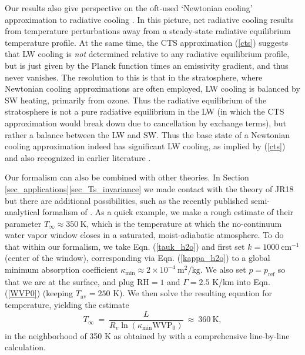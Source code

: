 \documentclass{ametsoc}
\newcommand{\beqn}{\begin{equation}}
\newcommand{\eeqn}{\end{equation}}
\newcommand{\n}{\nonumber}
\newcommand{\eqnref}[1]{(\ref{#1})}
\newcommand{\kg}{\ensuremath{\mathrm{kg}}}
\newcommand{\meter}{\ensuremath{\mathrm{m}}}
\newcommand{\Kelvin}{\ensuremath{\mathrm{K}}}
\newcommand{\cminverse}{\ensuremath{\mathrm{cm^{-1}}}}
\newcommand{\Rv}{\ensuremath{R_v}}
\newcommand{\Ts}{\ensuremath{T_\mathrm{s}}}
\newcommand{\RH}{\ensuremath{\mathrm{RH}}}
\newcommand{\pref}{\ensuremath{p_{\mathrm{ref}}}}
\newcommand{\WVP}{\ensuremath{\mathrm{WVP}}}
\newcommand{\Tav}{\ensuremath{T_{\mathrm{av}}}}
\newcommand{\Tinf}{\ensuremath{T_\infty}}
\newcommand{\kappamin}{\ensuremath{\kappa_{\mathrm{min}}}}
\begin{document}
Our results also give perspective on the oft-used `Newtonian cooling' approximation to radiative cooling \cite[e.g.][]{fueglistaler2009}. In this picture, net radiative cooling results from temperature perturbations away from a steady-state radiative equilibrium  temperature profile. At the same time, the CTS approximation \eqnref{cts}  suggests that LW cooling is \emph{not} determined relative to any radiative equilibrium profile, but is just given by the Planck function  times an emissivity gradient, and thus never vanishes. The resolution to this is that in the stratosphere, where Newtonian cooling approximations are often employed, LW cooling is balanced by SW heating, primarily from ozone. Thus the radiative equilibrium of the stratosphere is not a pure radiative equilibrium in the LW (in which the CTS approximation would break down due to cancellation by exchange terms), but rather a balance between the LW and SW. Thus the base state of a Newtonian cooling approximation indeed has significant LW cooling, as implied by \eqnref{cts} and also recognized in earlier literature \citep[e.g.][]{dickinson1973}.

Our formalism can also be combined with other theories. In Section \ref{sec_applications}\ref{sec_Ts_invariance} we made contact with the theory of JR18 but there are additional possibilities, such as the recently published semi-analytical formalism of \cite{koll2018}. As a quick example, we make a rough estimate of their parameter $\Tinf\approx 350 \ \Kelvin$, which is the temperature at which the no-continuum water vapor window closes in a saturated, moist-adiabatic atmosphere. To do that within our formalism, we take Eqn. \eqnref{tauk_h2o} and first set $k=1000\ \cminverse$ (center of the window), corresponding via Eqn. \eqnref{kappa_h2o} to a global minimum absorption coefficient $\kappamin\approx2\times 10^{-4}\ \meter^2/\kg$. We also set $p=\pref$ so that we are at the surface, and plug $\RH=1$ and $\Gamma=2.5$ K/km \citep[estimated from the $\Ts=350$ K adiabat in Fig. S1  of ][]{goldblatt2013} into Eqn. \eqnref{WVP0} (keeping $\Tav=250$ K). We then solve the resulting equation for temperature, yielding the  estimate
\beqn
	\Tinf \ = \ \frac{L}{\Rv \ln(\kappamin\WVP_0)} \ \approx \ 360 \ \Kelvin,
	\n
\eeqn
in the neighborhood  of  350 K as obtained by \cite{koll2018} with a comprehensive line-by-line calculation.
\end{document}
